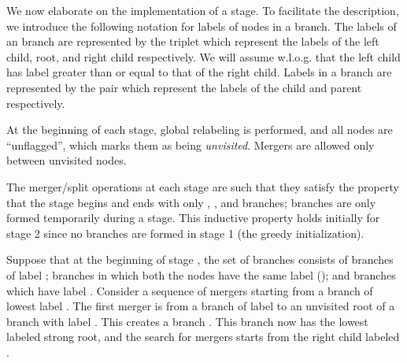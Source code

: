 \documentclass{article}
\begin{document}
We now elaborate on the implementation of a stage.  To facilitate the description, we introduce the following notation for labels of nodes in a branch. The labels of an  branch are represented by the triplet  which represent the labels of the left child, root, and right child respectively. We will assume w.l.o.g. that the left child has label greater than or equal to that of the right child.  Labels in a  branch are represented by the pair  which represent the labels of the child and parent respectively.

At the beginning of each stage, global relabeling is performed, and all nodes are ``unflagged'', which marks them as being {\em unvisited}. Mergers are allowed only between unvisited nodes.

The merger/split operations at each stage are such that they satisfy the property that the stage begins and ends with only , , and  branches;  branches are only formed temporarily during a stage. This inductive property holds initially for stage 2 since no  branches are formed in stage 1 (the greedy initialization).

Suppose that at the beginning of stage , the set of branches consists of  branches of label ;  branches in which both the nodes have the same label  (); and  branches which have label . Consider a sequence of mergers starting from a  branch of lowest label .  The first merger is from a  branch of label  to an unvisited root of a  branch with label . This creates a  branch . This branch now has the lowest labeled strong root, and the search for mergers starts from the right child labeled .
\end{document}
